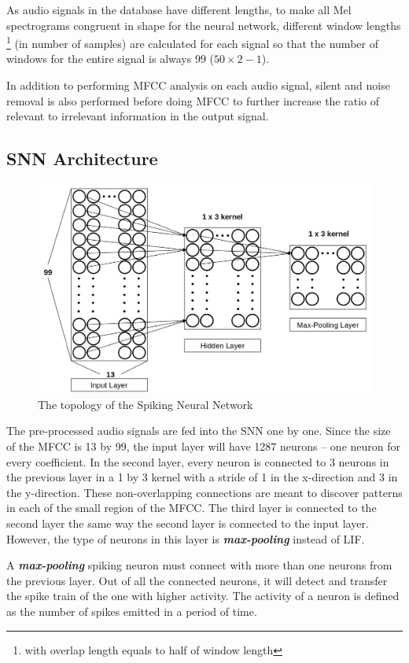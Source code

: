 \documentclass[11pt]{article}  %
\begin{document}
As audio signals in the database have different lengths, to make all Mel spectrograms congruent in shape for the neural network, different window lengths \footnote{with overlap length equals to half of window length} (in number of samples) are calculated for each signal so that the number of windows for the entire signal is always 99 ($50\times 2-1$).

In addition to performing MFCC analysis on each audio signal, silent and noise removal is also performed before doing MFCC to further increase the ratio of relevant to irrelevant information in the output signal.

\subsection{SNN Architecture}

\begin{figure}[!htb]
	\centering
	\includegraphics[width=0.6\linewidth]{"snn topology"}
	\caption{The topology of the Spiking Neural Network}
	\label{fig:snn-topology}
\end{figure}

The pre-processed audio signals are fed into the SNN one by one. Since the size of the MFCC is 13 by 99, the input layer will have 1287 neurons -- one neuron for every coefficient. In the second layer, every neuron is connected to 3 neurons in the previous layer in a 1 by 3 kernel with a stride of 1 in the x-direction and 3 in the y-direction. These non-overlapping connections are meant to discover patterns in each of the small region of the MFCC. The third layer is connected to the second layer the same way the second layer is connected to the input layer. However, the type of neurons in this layer is \textbf{\textit{max-pooling}} instead of LIF. 

A \textit{\textbf{max-pooling}} spiking neuron must connect with more than one neurons from the previous layer. Out of all the connected neurons, it will detect and transfer the spike train of the one with higher activity. The activity of a neuron is defined as the number of spikes emitted in a period of time. 
\end{document}
